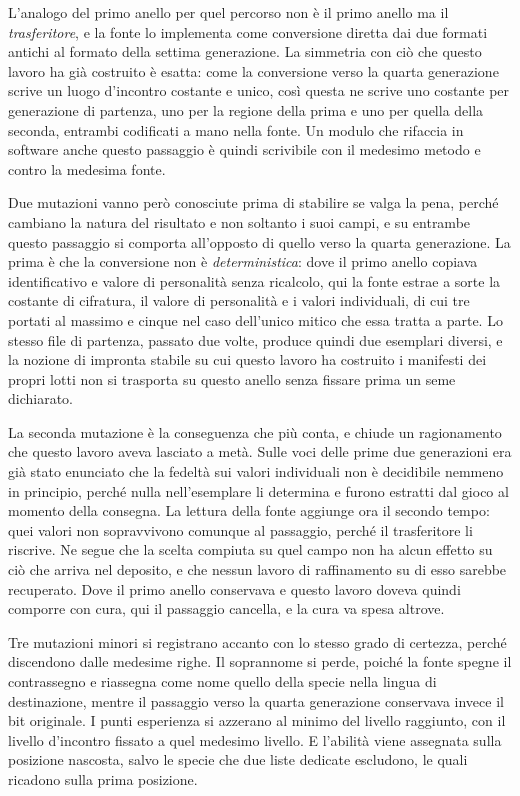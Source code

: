 L'analogo del primo anello per quel percorso non è il primo anello ma il \emph{trasferitore}, e la fonte lo implementa come conversione diretta dai due formati antichi al formato della settima generazione. La simmetria con ciò che questo lavoro ha già costruito è esatta: come la conversione verso la quarta generazione scrive un luogo d'incontro costante e unico, così questa ne scrive uno costante per generazione di partenza, uno per la regione della prima e uno per quella della seconda, entrambi codificati a mano nella fonte. Un modulo che rifaccia in software anche questo passaggio è quindi scrivibile con il medesimo metodo e contro la medesima fonte.

Due mutazioni vanno però conosciute prima di stabilire se valga la pena, perché cambiano la natura del risultato e non soltanto i suoi campi, e su entrambe questo passaggio si comporta all'opposto di quello verso la quarta generazione. La prima è che la conversione non è \emph{deterministica}: dove il primo anello copiava identificativo e valore di personalità senza ricalcolo, qui la fonte estrae a sorte la costante di cifratura, il valore di personalità e i valori individuali, di cui tre portati al massimo e cinque nel caso dell'unico mitico che essa tratta a parte. Lo stesso file di partenza, passato due volte, produce quindi due esemplari diversi, e la nozione di impronta stabile su cui questo lavoro ha costruito i manifesti dei propri lotti non si trasporta su questo anello senza fissare prima un seme dichiarato.

La seconda mutazione è la conseguenza che più conta, e chiude un ragionamento che questo lavoro aveva lasciato a metà. Sulle voci delle prime due generazioni era già stato enunciato che la fedeltà sui valori individuali non è decidibile nemmeno in principio, perché nulla nell'esemplare li determina e furono estratti dal gioco al momento della consegna. La lettura della fonte aggiunge ora il secondo tempo: quei valori non sopravvivono comunque al passaggio, perché il trasferitore li riscrive. Ne segue che la scelta compiuta su quel campo non ha alcun effetto su ciò che arriva nel deposito, e che nessun lavoro di raffinamento su di esso sarebbe recuperato. Dove il primo anello conservava e questo lavoro doveva quindi comporre con cura, qui il passaggio cancella, e la cura va spesa altrove.

Tre mutazioni minori si registrano accanto con lo stesso grado di certezza, perché discendono dalle medesime righe. Il soprannome si perde, poiché la fonte spegne il contrassegno e riassegna come nome quello della specie nella lingua di destinazione, mentre il passaggio verso la quarta generazione conservava invece il bit originale. I punti esperienza si azzerano al minimo del livello raggiunto, con il livello d'incontro fissato a quel medesimo livello. E l'abilità viene assegnata sulla posizione nascosta, salvo le specie che due liste dedicate escludono, le quali ricadono sulla prima posizione.

